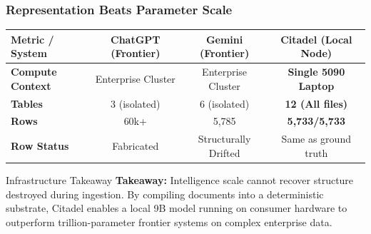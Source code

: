 \documentclass[aspectratio=169,11pt]{beamer}
\begin{document}
	\begin{frame}
		\frametitle{Representation Beats Parameter Scale}

		\begin{center}
			\small
			\begin{tabular}{lccc}
				\toprule
				\textbf{Metric / System} & \textbf{ChatGPT (Frontier)} & \textbf{Gemini (Frontier)} & \textbf{Citadel (Local Node)} \\
				\midrule
				\textbf{Compute Context} & Enterprise Cluster & Enterprise Cluster & \textbf{Single 5090 Laptop} \\
				\textbf{Tables} & 3 (isolated) & 6 (isolated) & \textbf{12 (All files)} \\
				\textbf{Rows} & \color{accent}60k+ & \color{accent}5,785 & \textbf{5,733/5,733}\\
				\textbf{Row Status} & Fabricated & Structurally Drifted & Same as ground truth\\
				\bottomrule
			\end{tabular}
		\end{center}
		\vfill
		\begin{block}{\scriptsize Infrastructure Takeaway}
			{\tiny
				\textbf{Takeaway:} Intelligence scale cannot recover structure destroyed during ingestion. By compiling documents into a deterministic substrate, Citadel enables a local 9B model running on consumer hardware to outperform trillion-parameter frontier systems on complex enterprise data.
			}
		\end{block}
	\end{frame}
\end{document}

